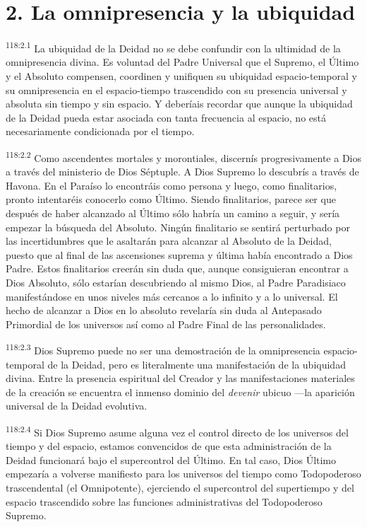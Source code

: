 \documentclass[twoside, 11pt]{book}
\begin{document}
\section*{2. La omnipresencia y la ubiquidad}
\par
\textsuperscript{118:2.1} La ubiquidad de la Deidad no se debe confundir con la ultimidad de la omnipresencia divina. Es voluntad del Padre Universal que el Supremo, el Último y el Absoluto compensen, coordinen y unifiquen su ubiquidad espacio-temporal y su omnipresencia en el espacio-tiempo trascendido con su presencia universal y absoluta sin tiempo y sin espacio. Y deberíais recordar que aunque la ubiquidad de la Deidad pueda estar asociada con tanta frecuencia al espacio, no está necesariamente condicionada por el tiempo.

\par
\textsuperscript{118:2.2} Como ascendentes mortales y morontiales, discernís progresivamente a Dios a través del ministerio de Dios Séptuple. A Dios Supremo lo descubrís a través de Havona. En el Paraíso lo encontráis como persona y luego, como finalitarios, pronto intentaréis conocerlo como Último. Siendo finalitarios, parece ser que después de haber alcanzado al Último sólo habría un camino a seguir, y sería empezar la búsqueda del Absoluto. Ningún finalitario se sentirá perturbado por las incertidumbres que le asaltarán para alcanzar al Absoluto de la Deidad, puesto que al final de las ascensiones suprema y última había encontrado a Dios Padre. Estos finalitarios creerán sin duda que, aunque consiguieran encontrar a Dios Absoluto, sólo estarían descubriendo al mismo Dios, al Padre Paradisiaco manifestándose en unos niveles más cercanos a lo infinito y a lo universal. El hecho de alcanzar a Dios en lo absoluto revelaría sin duda al Antepasado Primordial de los universos así como al Padre Final de las personalidades.

\par
\textsuperscript{118:2.3} Dios Supremo puede no ser una demostración de la omnipresencia espacio-temporal de la Deidad, pero es literalmente una manifestación de la ubiquidad divina. Entre la presencia espiritual del Creador y las manifestaciones materiales de la creación se encuentra el inmenso dominio del \textit{devenir} ubicuo ---la aparición universal de la Deidad evolutiva.

\par
\textsuperscript{118:2.4} Si Dios Supremo asume alguna vez el control directo de los universos del tiempo y del espacio, estamos convencidos de que esta administración de la Deidad funcionará bajo el supercontrol del Último. En tal caso, Dios Último empezaría a volverse manifiesto para los universos del tiempo como Todopoderoso trascendental (el Omnipotente), ejerciendo el supercontrol del supertiempo y del espacio trascendido sobre las funciones administrativas del Todopoderoso Supremo.
\end{document}
